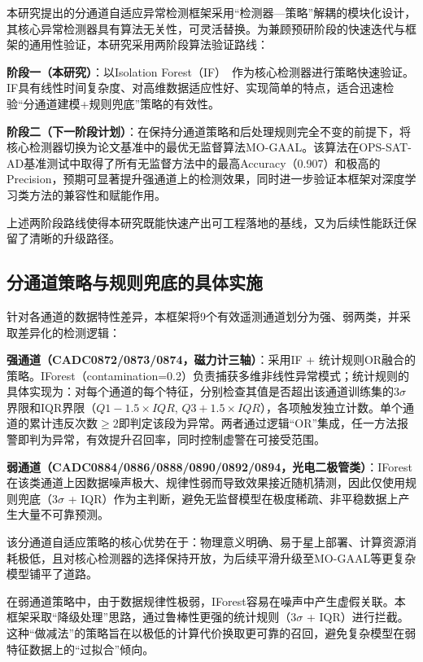 \documentclass[conference]{IEEEtran}
\begin{document}
本研究提出的分通道自适应异常检测框架采用``检测器—策略''解耦的模块化设计，其核心异常检测器具有算法无关性，可灵活替换。为兼顾预研阶段的快速迭代与框架的通用性验证，本研究采用两阶段算法验证路线：

\textbf{阶段一（本研究）}：以Isolation Forest（IF）~\cite{Liu2008}作为核心检测器进行策略快速验证。IF具有线性时间复杂度、对高维数据适应性好、实现简单的特点，适合迅速检验``分通道建模+规则兜底''策略的有效性。

\textbf{阶段二（下一阶段计划）}：在保持分通道策略和后处理规则完全不变的前提下，将核心检测器切换为论文基准中的最优无监督算法MO-GAAL。该算法在OPS-SAT-AD基准测试中取得了所有无监督方法中的最高Accuracy（0.907）和极高的Precision，预期可显著提升强通道上的检测效果，同时进一步验证本框架对深度学习类方法的兼容性和赋能作用。

上述两阶段路线使得本研究既能快速产出可工程落地的基线，又为后续性能跃迁保留了清晰的升级路径。

\subsection{分通道策略与规则兜底的具体实施}

针对各通道的数据特性差异，本框架将9个有效遥测通道划分为强、弱两类，并采取差异化的检测逻辑：

\textbf{强通道（CADC0872/0873/0874，磁力计三轴）}：采用IF + 统计规则OR融合的策略。IForest（contamination=0.2）负责捕获多维非线性异常模式；统计规则的具体实现为：对每个通道的每个特征，分别检查其值是否超出该通道训练集的$3\sigma$界限和IQR界限（$Q1-1.5\times IQR$, $Q3+1.5\times IQR$），各项触发独立计数。单个通道的累计违反次数$\geq 2$即判定该段为异常。两者通过逻辑``OR''集成，任一方法报警即判为异常，有效提升召回率，同时控制虚警在可接受范围。

\textbf{弱通道（CADC0884/0886/0888/0890/0892/0894，光电二极管类）}：IForest在该类通道上因数据噪声极大、规律性弱而导致效果接近随机猜测，因此仅使用规则兜底（$3\sigma$ + IQR）作为主判断，避免无监督模型在极度稀疏、非平稳数据上产生大量不可靠预测。

该分通道自适应策略的核心优势在于：物理意义明确、易于星上部署、计算资源消耗极低，且对核心检测器的选择保持开放，为后续平滑升级至MO-GAAL等更复杂模型铺平了道路。

在弱通道策略中，由于数据规律性极弱，IForest容易在噪声中产生虚假关联。本框架采取``降级处理''思路，通过鲁棒性更强的统计规则（$3\sigma$ + IQR）进行拦截。这种``做减法''的策略旨在以极低的计算代价换取更可靠的召回，避免复杂模型在弱特征数据上的``过拟合''倾向。
\end{document}

